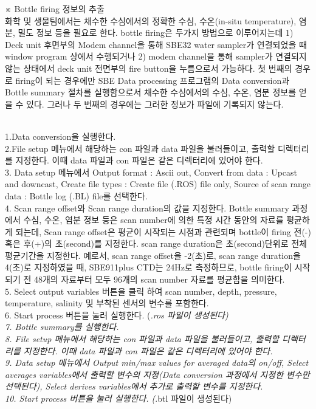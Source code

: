 \documentclass[
]{book}
\begin{document}
※ Bottle firing 정보의 추출\\
화학 및 생물팀에서는 채수한 수심에서의 정확한 수심, 수온(in-situ temperature), 염분, 밀도 정보 등을 필요로 한다. bottle firing은 두가지 방법으로 이루어지는데 1) Deck unit 후면부의 Modem channel을 통해 SBE32 water sampler가 연결되었을 때 window program 상에서 수행되거나 2) modem channel을 통해 sampler가 연결되지 않는 상태에서 deck unit 전면부의 fire button을 누름으로서 가능하다. 첫 번째의 경우로 firing이 되는 경우에만 SBE Data processing 프로그램의 Data conversion과 Bottle summary 절차를 실행함으로서 채수한 수심에서의 수심, 수온, 염분 정보를 얻을 수 있다. 그러나 두 번째의 경우에는 그러한 정보가 파일에 기록되지 않는다.

\textbf{}\strut \\
1.Data conversion을 실행한다.\\
2.File setup 메뉴에서 해당하는 con 파일과 data 파일을 불러들이고, 출력할 디렉터리를 지정한다. 이때 data 파일과 con 파일은 같은 디렉터리에 있어야 한다.\\
3. Data setup 메뉴에서 Output format : Ascii out, Convert from data : Upcast and downcast, Create file types : Create file (.ROS) file only, Source of scan range data : Bottle log (.BL) file를 선택한다.\\
4. Scan range offset와 Scan range duration의 값을 지정한다. Bottle summary 과정에서 수심, 수온, 염분 정보 등은 scan number에 의한 특정 시간 동안의 자료를 평균하게 되는데, Scan range offset은 평균이 시작되는 시점과 관련되며 bottle이 firing 전(-) 혹은 후(+)의 초(second)를 지정한다. scan range duration은 초(second)단위로 전체 평균기간을 지정한다. 예로서, scan range offset을 -2(초)로, scan range duration을 4(초)로 지정하였을 때, SBE911plus CTD는 24Hz로 측정하므로, bottle firing이 시작되기 전 48개의 자료부터 모두 96개의 scan number 자료를 평균함을 의미한다.\\
5. Select output variables 버튼을 클릭 하여 scan number, depth, pressure, temperature, salinity 및 부착된 센서의 변수를 포함한다.\\
6. Start process 버튼을 눌러 실행한다. (\emph{.ros 파일이 생성된다)\\
7. Bottle summary를 실행한다.\\
8. File setup 메뉴에서 해당하는 con 파일과 data 파일을 불러들이고, 출력할 디렉터리를 지정한다. 이때 data 파일과 con 파일은 같은 디렉터리에 있어야 한다.\\
9. Data setup 메뉴에서 Output min/max values for averaged data의 on/off, Select averages variables에서 출력할 변수의 지정(Data conversion 과정에서 지정한 변수만 선택된다), Select derives variables에서 추가로 출력할 변수를 지정한다.\\
10. Start process 버튼을 눌러 실행한다. (}.btl 파일이 생성된다)
\end{document}
